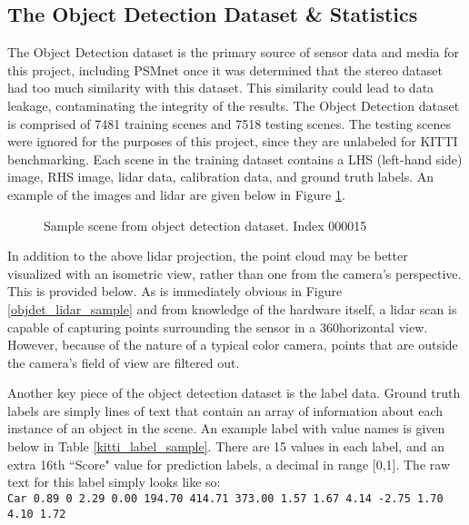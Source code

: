 \subsection{The Object Detection Dataset \& Statistics}
The Object Detection dataset is the primary source of sensor data and media for this project, including PSMnet once it was determined that the stereo dataset had too much similarity with this dataset. This similarity could lead to data leakage, contaminating the integrity of the results. The Object Detection dataset is comprised of 7481 training scenes and 7518 testing scenes. The testing scenes were ignored for the purposes of this project, since they are unlabeled for KITTI benchmarking. Each scene in the training dataset contains a LHS (left-hand side) image, RHS image, lidar data, calibration data, and ground truth labels. An example of the images and lidar are given below in Figure \ref{objdet_sample}.

\begin{figure}[H]
    \centering
    \caption{Sample scene from object detection dataset. Index 000015}
    \label{objdet_sample}
\end{figure}

In addition to the above lidar projection, the point cloud may be better visualized with an isometric view, rather than one from the camera's perspective. This is provided below. As is immediately obvious in Figure \ref{objdet_lidar_sample} and from knowledge of the hardware itself, a lidar scan is capable of capturing points surrounding the sensor in a 360\deg horizontal view. However, because of the nature of a typical color camera, points that are outside the camera's field of view are filtered out.

Another key piece of the object detection dataset is the label data. Ground truth labels are simply lines of text that contain an array of information about each instance of an object in the scene. An example label with value names is given below in Table \ref{kitti_label_sample}. There are 15 values in each label, and an extra 16th ``Score" value for prediction labels, a decimal in range [0,1]. The raw text for this label simply looks like so: \\
\texttt{Car 0.89 0 2.29 0.00 194.70 414.71 373.00 1.57 1.67 4.14 -2.75 1.70 4.10 1.72} \\

